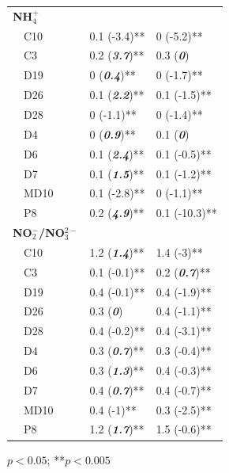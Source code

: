 \documentclass[journal = esthag, manuscript = article]{achemso}\usepackage[]{graphicx}\usepackage[]{color}
\begin{document}
\begin{suppinfo}
\begin{table}[!tbp]
\begin{center}
\begin{tabular}{lll}
\hline
{\bfseries NH$_{4}^{+}$}&&\tabularnewline
~~C10&0.1 \footnotesize{(-3.4)**}&0 \footnotesize{(-5.2)**}\tabularnewline
~~C3&0.2 \footnotesize{(\textit{\textbf{3.7}})**}&0.3 \footnotesize{(\textit{\textbf{0}})}\tabularnewline
~~D19&0 \footnotesize{(\textit{\textbf{0.4}})**}&0 \footnotesize{(-1.7)**}\tabularnewline
~~D26&0.1 \footnotesize{(\textit{\textbf{2.2}})**}&0.1 \footnotesize{(-1.5)**}\tabularnewline
~~D28&0 \footnotesize{(-1.1)**}&0 \footnotesize{(-1.4)**}\tabularnewline
~~D4&0 \footnotesize{(\textit{\textbf{0.9}})**}&0.1 \footnotesize{(\textit{\textbf{0}})}\tabularnewline
~~D6&0.1 \footnotesize{(\textit{\textbf{2.4}})**}&0.1 \footnotesize{(-0.5)**}\tabularnewline
~~D7&0.1 \footnotesize{(\textit{\textbf{1.5}})**}&0.1 \footnotesize{(-1.2)**}\tabularnewline
~~MD10&0.1 \footnotesize{(-2.8)**}&0 \footnotesize{(-1.1)**}\tabularnewline
~~P8&0.2 \footnotesize{(\textit{\textbf{4.9}})**}&0.1 \footnotesize{(-10.3)**}\tabularnewline
\hline
{\bfseries NO$_{2}^{-}$/NO$_{3}^{2-}$}&&\tabularnewline
~~C10&1.2 \footnotesize{(\textit{\textbf{1.4}})**}&1.4 \footnotesize{(-3)**}\tabularnewline
~~C3&0.1 \footnotesize{(-0.1)**}&0.2 \footnotesize{(\textit{\textbf{0.7}})**}\tabularnewline
~~D19&0.4 \footnotesize{(-0.1)**}&0.4 \footnotesize{(-1.9)**}\tabularnewline
~~D26&0.3 \footnotesize{(\textit{\textbf{0}})}&0.4 \footnotesize{(-1.1)**}\tabularnewline
~~D28&0.4 \footnotesize{(-0.2)**}&0.4 \footnotesize{(-3.1)**}\tabularnewline
~~D4&0.3 \footnotesize{(\textit{\textbf{0.7}})**}&0.3 \footnotesize{(-0.4)**}\tabularnewline
~~D6&0.3 \footnotesize{(\textit{\textbf{1.3}})**}&0.4 \footnotesize{(-0.3)**}\tabularnewline
~~D7&0.4 \footnotesize{(\textit{\textbf{0.7}})**}&0.4 \footnotesize{(-0.7)**}\tabularnewline
~~MD10&0.4 \footnotesize{(-1)**}&0.3 \footnotesize{(-2.5)**}\tabularnewline
~~P8&1.2 \footnotesize{(\textit{\textbf{1.7}})**}&1.5 \footnotesize{(-0.6)**}\tabularnewline
\hline
\end{tabular}\end{center}

\footnotesize *$p<0.05$; **$p<0.005$\end{table}



\end{suppinfo}
\end{document}
